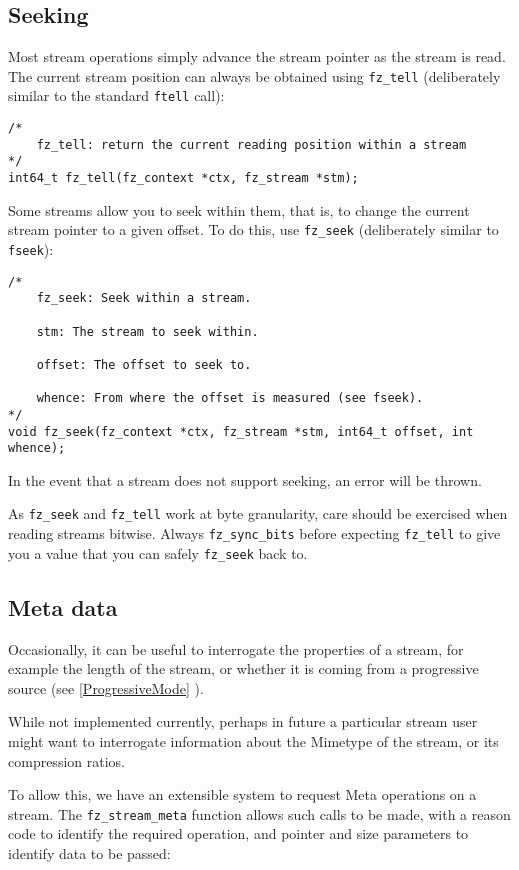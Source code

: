 \documentclass[oneside]{book}
\newcommand{\rjwref}[1] {\autoref{#1} \nameref{#1}}
\begin{document}
\subsection{Seeking}

Most stream operations simply advance the stream pointer as the stream is read. The current stream position can always be obtained using \texttt{fz\_tell} (deliberately similar to the standard \texttt{ftell} call):

\begin{lstlisting}
/*
	fz_tell: return the current reading position within a stream
*/
int64_t fz_tell(fz_context *ctx, fz_stream *stm);
\end{lstlisting}

Some streams allow you to seek within them, that is, to change the current stream pointer to a given offset. To do this, use \texttt{fz\_seek} (deliberately similar to \texttt{fseek}):

\begin{lstlisting}
/*
	fz_seek: Seek within a stream.

	stm: The stream to seek within.

	offset: The offset to seek to.

	whence: From where the offset is measured (see fseek).
*/
void fz_seek(fz_context *ctx, fz_stream *stm, int64_t offset, int whence);
\end{lstlisting}

In the event that a stream does not support seeking, an error will be thrown.

As \texttt{fz\_seek} and \texttt{fz\_tell} work at byte granularity, care should be exercised when reading streams bitwise. Always \texttt{fz\_sync\_bits} before expecting \texttt{fz\_tell} to give you a value that you can safely \texttt{fz\_seek} back to.

\subsection{Meta data}

Occasionally, it can be useful to interrogate the properties of a stream, for example the length of the stream, or whether it is coming from a progressive source (see \rjwref{ProgressiveMode}).

While not implemented currently, perhaps in future a particular stream user might want to interrogate information about the Mimetype of the stream, or its compression ratios.

To allow this, we have an extensible system to request Meta operations on a stream. The \texttt{fz\_stream\_meta} function allows such calls to be made, with a reason code to identify the required operation, and pointer and size parameters to identify data to be passed:
\end{document}
